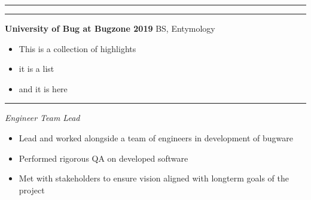 \documentclass[a4paper, 12pt]{article}
\begin{document}
\begin{flushright}
\end{flushright}
\vspace{-40pt}
\begin{flushleft}
\noindent\rule{\textwidth}{0.4pt}
\end{flushleft}
\begin{flushleft}
\newline
\end{flushleft}
\begin{flushleft}
\noindent\rule{\textwidth}{0.4pt}
\end{flushleft}
\begin{flushleft}
\textbf{University of Bug at Bugzone\hfill
2019}
\newline
BS, Entymology\begin{multicols}{2}
\begin{itemize}
\item This is a collection of highlights
\item it is a list
\item and it is here
\end{itemize}
\end{multicols}
\end{flushleft}
\begin{flushleft}
\end{flushleft}
\noindent\rule{\textwidth}{0.4pt}
\begin{flushleft}
\newline
\textit{Engineer Team Lead}
\begin{itemize}
\item Lead and worked alongside a team of engineers in development of bugware
\item Performed rigorous QA on developed software
\item Met with stakeholders to ensure vision aligned with longterm goals of the project
\end{itemize}
\end{flushleft}
\end{document}
